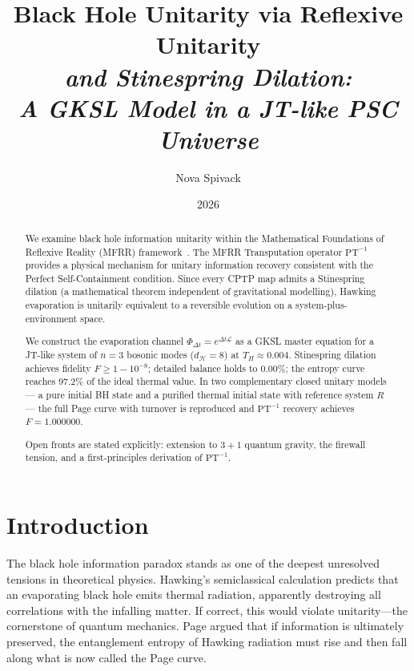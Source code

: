\documentclass[11pt,twocolumn]{article}
\title{\bfseries Black Hole Unitarity via Reflexive Unitarity\\
\large\itshape and Stinespring Dilation:\\
\normalsize A GKSL Model in a JT-like PSC Universe}
\author{Nova Spivack}
\date{2026}
\theoremstyle{remark}
\begin{document}
\maketitle
\NovaZenodoAfterTitle

\begin{abstract}
We examine black hole information unitarity within the Mathematical Foundations
of Reflexive Reality (MFRR) framework~\cite{SpivackNEMSMFRRBridge}.
The MFRR Transputation operator $\mathrm{PT}^{-1}$ provides a physical mechanism
for unitary information recovery consistent with the Perfect Self-Containment
condition. Since every CPTP map admits a Stinespring dilation (a mathematical
theorem independent of gravitational modelling), Hawking evaporation is
unitarily equivalent to a reversible evolution on a system-plus-environment space.

We construct the evaporation channel $\Phi_{\Delta t} = e^{\Delta t\mathcal{L}}$
as a GKSL master equation for a JT-like system of $n=3$ bosonic modes
($d_{\mathcal{H}} = 8$) at $T_H \approx 0.004$.
Stinespring dilation achieves fidelity $F \geq 1 - 10^{-8}$; detailed balance
holds to 0.00\%; the entropy curve reaches $97.2\%$ of the ideal thermal value.
In two complementary closed unitary models --- a pure initial BH state and a
purified thermal initial state with reference system $R$ --- the full Page curve
with turnover is reproduced and $\mathrm{PT}^{-1}$ recovery achieves $F = 1.000000$.

Open fronts are stated explicitly: extension to $3+1$ quantum gravity, the firewall
tension, and a first-principles derivation of $\mathrm{PT}^{-1}$.
\end{abstract}

\tableofcontents

\section{Introduction}
\label{sec:intro}

The black hole information paradox \cite{Hawking1974,Hawking1976}
stands as one of the deepest unresolved tensions in theoretical physics.
Hawking's semiclassical calculation \cite{Hawking1975} predicts that an
evaporating black hole emits thermal radiation, apparently destroying
all correlations with the infalling matter. If correct, this would
violate unitarity---the cornerstone of quantum mechanics. Page argued
\cite{Page1993} that if information is ultimately preserved, the
entanglement entropy of Hawking radiation must rise and then fall along
what is now called the Page curve.
\end{document}
